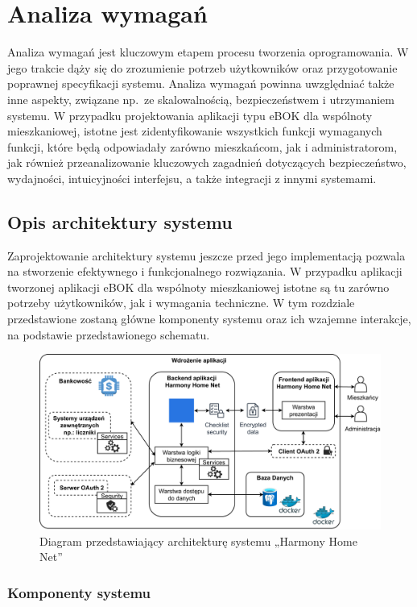 \chapter{Analiza wymagań}
Analiza wymagań jest kluczowym etapem procesu tworzenia oprogramowania. W jego trakcie dąży się do zrozumienie potrzeb użytkowników oraz przygotowanie poprawnej specyfikacji systemu. Analiza wymagań powinna uwzględniać także inne aspekty, związane np.\ ze skalowalnością, bezpieczeństwem i utrzymaniem systemu. W przypadku projektowania aplikacji typu eBOK dla wspólnoty mieszkaniowej, istotne jest zidentyfikowanie wszystkich funkcji wymaganych funkcji, które będą odpowiadały zarówno mieszkańcom, jak i administratorom, jak również przeanalizowanie kluczowych zagadnień dotyczących bezpieczeństwo, wydajności, intuicyjności interfejsu, a także integracji z innymi systemami. 

\section{Opis architektury systemu}
Zaprojektowanie architektury systemu jeszcze przed jego implementacją pozwala na stworzenie efektywnego i funkcjonalnego rozwiązania. W przypadku aplikacji tworzonej aplikacji eBOK dla wspólnoty mieszkaniowej istotne są tu zarówno potrzeby użytkowników, jak i wymagania techniczne. W tym rozdziale przedstawione zostaną główne komponenty systemu oraz ich wzajemne interakcje, na podstawie przedstawionego schematu.
\begin{figure}[ht]
    \centering
    \includegraphics[width=.8\linewidth]{Schematy/zarys_architektury} %
    \caption{Diagram przedstawiający architekturę systemu „Harmony Home Net”}
    \label{fig:zarys_architektury}
\end{figure}


\subsection{Komponenty systemu}

